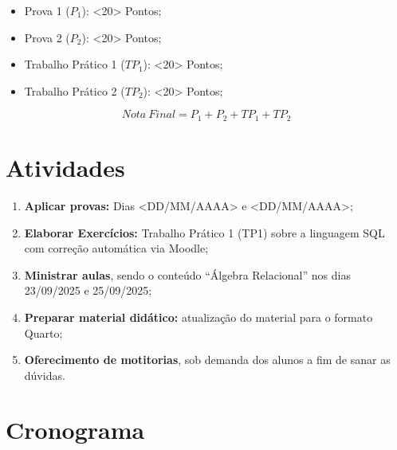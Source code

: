 \documentclass[12pt, a4paper]{article}
\begin{document}
\begin{itemize}
    \item Prova 1 ($P_1$): <20> Pontos;
    \item Prova 2 ($P_2$): <20> Pontos;
    \item Trabalho Prático 1 ($TP_1$): <20> Pontos;
    \item Trabalho Prático 2 ($TP_2$): <20> Pontos;
\end{itemize}

$$Nota\ Final = P_1 + P_2 + TP_1 + TP_2$$



\section{Atividades} \label{sec:atividades}



\begin{enumerate}
    \item \textbf{Aplicar provas:} Dias <DD/MM/AAAA> e <DD/MM/AAAA>;
    \item \textbf{Elaborar Exercícios:} Trabalho Prático 1 (TP1) sobre a linguagem SQL com correção automática via Moodle;
    \item \textbf{Ministrar aulas}, sendo o conteúdo ``Álgebra Relacional'' nos dias 23/09/2025 e 25/09/2025;
    \item \textbf{Preparar material didático:} atualização do material para o formato Quarto;
    \item \textbf{Oferecimento de motitorias}, sob demanda dos alunos a fim de sanar as dúvidas.
\end{enumerate}

\section{Cronograma} \label{sec:cronograma}


\end{document}
